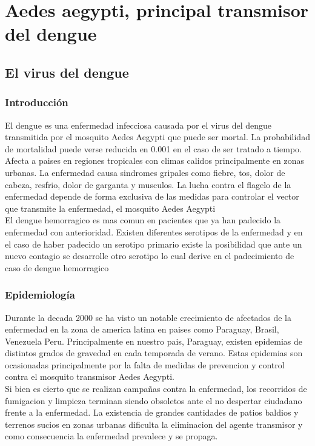 \chapter{Aedes aegypti, principal transmisor del dengue}

\section{El virus del dengue}

\subsection{Introducción}
El dengue es una enfermedad infecciosa causada por el virus del dengue transmitida por el mosquito Aedes Aegypti que puede ser mortal. La probabilidad de mortalidad puede verse reducida en 0.001 en el caso de ser tratado a tiempo.\\

Afecta a paises en regiones tropicales con climas calidos principalmente en zonas urbanas. La enfermedad causa sindromes gripales como fiebre, tos, dolor de cabeza, resfrio, dolor de garganta y musculos. La lucha contra el flagelo de la enfermedad depende de forma exclusiva de las medidas para controlar el vector que transmite la enfermedad, el mosquito Aedes Aegypti\\

El dengue hemorragico es mas comun en pacientes que ya han padecido la enfermedad con anterioridad. Existen diferentes serotipos de la enfermedad y en el caso de haber padecido un serotipo primario existe la posibilidad que ante un nuevo contagio se desarrolle otro serotipo lo cual derive en el padecimiento de caso de dengue hemorragico

\subsection{Epidemiología}

Durante la decada 2000 se ha visto un notable crecimiento de afectados de la enfermedad en la zona de america latina en paises como Paraguay, Brasil, Venezuela Peru. Principalmente en nuestro pais, Paraguay, existen epidemias  de distintos grados de gravedad en cada temporada de verano. Estas epidemias son ocasionadas principalmente por la falta de medidas de prevencion y control contra el mosquito transmisor Aedes Aegypti.\\

Si bien es cierto que se realizan campañas contra la enfermedad, los recorridos de fumigacion y limpieza terminan siendo obsoletos ante el no despertar ciudadano frente a la enfermedad. La existencia de grandes cantidades de patios baldios y terrenos sucios en zonas urbanas dificulta la eliminacion del agente transmisor y como consecuencia la enfermedad prevalece y se propaga.\\

